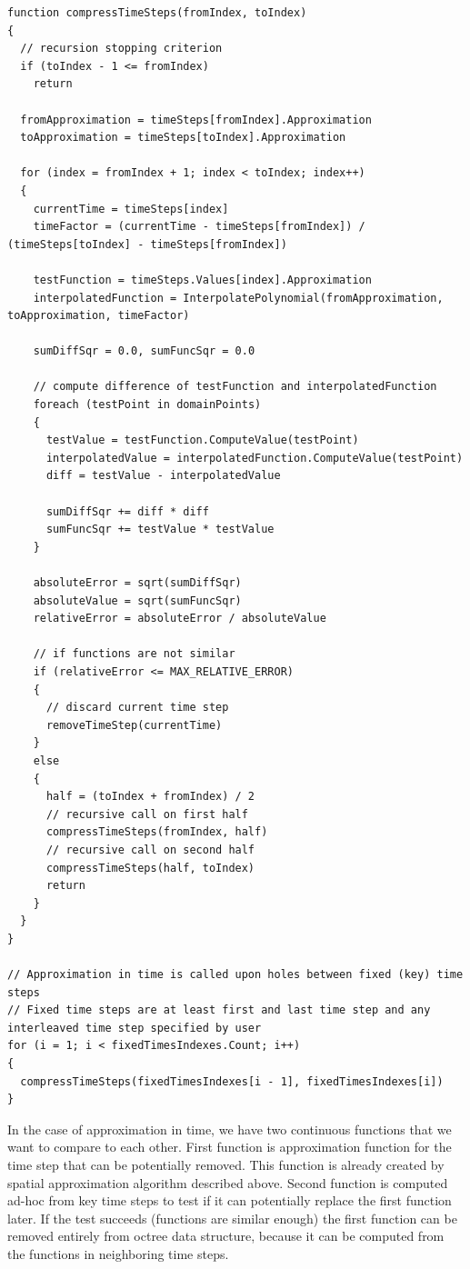 \begin{lstlisting}[caption=Approximation in time procedure,label=alg:approximation-in-time]
function compressTimeSteps(fromIndex, toIndex)
{
  // recursion stopping criterion
  if (toIndex - 1 <= fromIndex)
    return

  fromApproximation = timeSteps[fromIndex].Approximation
  toApproximation = timeSteps[toIndex].Approximation
  
  for (index = fromIndex + 1; index < toIndex; index++)
  {
    currentTime = timeSteps[index]
    timeFactor = (currentTime - timeSteps[fromIndex]) / (timeSteps[toIndex] - timeSteps[fromIndex])
    
    testFunction = timeSteps.Values[index].Approximation
    interpolatedFunction = InterpolatePolynomial(fromApproximation, toApproximation, timeFactor)

    sumDiffSqr = 0.0, sumFuncSqr = 0.0

    // compute difference of testFunction and interpolatedFunction
    foreach (testPoint in domainPoints)
    {
      testValue = testFunction.ComputeValue(testPoint)
      interpolatedValue = interpolatedFunction.ComputeValue(testPoint)
      diff = testValue - interpolatedValue
      
      sumDiffSqr += diff * diff
      sumFuncSqr += testValue * testValue
    }

    absoluteError = sqrt(sumDiffSqr)
    absoluteValue = sqrt(sumFuncSqr)
    relativeError = absoluteError / absoluteValue

    // if functions are not similar
    if (relativeError <= MAX_RELATIVE_ERROR)
    {
      // discard current time step
      removeTimeStep(currentTime)
    }
    else
    {
      half = (toIndex + fromIndex) / 2
      // recursive call on first half
      compressTimeSteps(fromIndex, half)
      // recursive call on second half
      compressTimeSteps(half, toIndex)
      return
    }
  }
}

// Approximation in time is called upon holes between fixed (key) time steps
// Fixed time steps are at least first and last time step and any interleaved time step specified by user
for (i = 1; i < fixedTimesIndexes.Count; i++)
{
  compressTimeSteps(fixedTimesIndexes[i - 1], fixedTimesIndexes[i])
}
\end{lstlisting}

In the case of approximation in time, we have two continuous functions that we want to compare to each other. First function is approximation function for the time step that can be potentially removed. This function is already created by spatial approximation algorithm described above. Second function is computed ad-hoc from key time steps to test if it can potentially replace the first function later. If the test succeeds (functions are similar enough) the first function can be removed entirely from octree data structure, because it can be computed from the functions in neighboring time steps.

